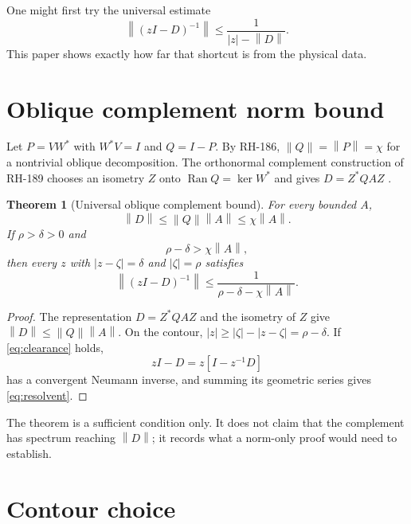 \documentclass[12pt]{article}
\newtheorem{theorem}{Theorem}[section]
\theoremstyle{remark}
\newcommand{\norm}[1]{\left\lVert#1\right\rVert}
\begin{document}
One might first try the universal estimate
\begin{equation}\label{eq:universal}
 \norm{(zI-D)^{-1}}
 \le\frac1{|z|-\norm D}.
\end{equation}
This paper shows exactly how far that shortcut is from the physical data.

\section{Oblique complement norm bound}

Let $P=VW^*$ with $W^*V=I$ and $Q=I-P$.  By RH-186,
$\norm Q=\norm P=\chi$ for a nontrivial oblique decomposition.  The
orthonormal complement construction of RH-189 chooses an isometry $Z$ onto
$\operatorname{Ran}Q=\ker W^*$ and gives
$D=Z^*QAZ$ \citep{WangRH189}.

\begin{theorem}[Universal oblique complement bound]\label{thm:complement}
For every bounded $A$,
\begin{equation}\label{eq:D-bound}
 \norm D\le\norm Q\norm A\le\chi\norm A.
\end{equation}
If $\rho>\delta>0$ and
\begin{equation}\label{eq:clearance}
 \rho-\delta>\chi\norm A,
\end{equation}
then every $z$ with $|z-\zeta|=\delta$ and $|\zeta|=\rho$ satisfies
\begin{equation}\label{eq:resolvent}
 \norm{(zI-D)^{-1}}
 \le\frac1{\rho-\delta-\chi\norm A}.
\end{equation}
\end{theorem}

\begin{proof}
The representation $D=Z^*QAZ$ and the isometry of $Z$ give
$\norm D\le\norm Q\norm A$.  On the contour,
$|z|\ge|\zeta|-|z-\zeta|=\rho-\delta$.  If \eqref{eq:clearance} holds,
\[
 zI-D=z\left[I-z^{-1}D\right]
\]
has a convergent Neumann inverse, and summing its geometric series gives
\eqref{eq:resolvent}.
\end{proof}

The theorem is a sufficient condition only.  It does not claim that the
complement has spectrum reaching $\norm D$; it records what a norm-only
proof would need to establish.

\section{Contour choice}
\end{document}
